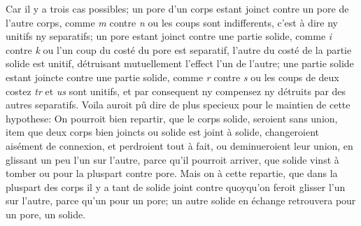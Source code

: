 \pstart  Car il y a trois cas possibles;  un pore d'un corps estant joinct contre un pore de l'autre corps, comme \textit{m} contre \textit{n} ou les coups sont indifferents, c'est \`{a} dire ny unitifs ny separatifs;  un pore estant joinct contre une partie solide, comme \textit{i} contre \textit{k} ou l'un coup du cost\'{e} du pore est separatif, l'autre du cost\'{e} de la partie solide est unitif, d\'{e}truisant mutuellement l'effect l'un de l'autre;  une partie solide estant joincte contre une partie solide, comme \textit{r} contre \textit{s} ou les coups de deux costez \textit{tr} et \textit{us} sont unitifs, et par consequent ny compensez ny d\'{e}truits par des autres separatifs. Voila  auroit pû dire de plus specieux pour le maintien de cette hypothese: On pourroit bien repartir, que le corps  solide, seroient sans union, item que deux corps bien joincts ou solide\protect{} est joint \`{a} solide, changeroient ais\'{e}ment de connexion, et perdroient tout \`{a} fait, ou deminueroient leur union, en glissant un peu l'un sur l'autre, parce qu'il pourroit arriver, que solide vinst \`{a} tomber  ou pour la pluspart contre pore. Mais on  \`{a} cette repartie, que dans la pluspart des corps  il y a tant de solide joint contre  quoyqu'on feroit glisser l'un sur l'autre, parce qu'un  pour un pore; un autre solide en \'{e}change retrouvera pour un pore, un solide.

